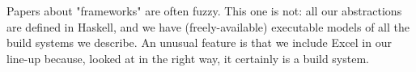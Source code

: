 Papers about "frameworks" are often fuzzy.  This one is not: all our
abstractions are defined in Haskell, and we have (freely-available)
executable models of all the build systems we describe.  An unusual
feature is that we include Excel in our line-up because, looked at
in the right way, it certainly is a build system.

